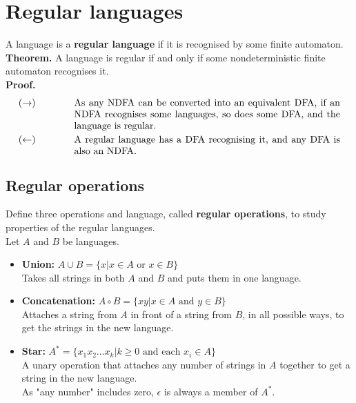 \documentclass{article}
\begin{document}
\section{Regular languages}
A language is a \textbf{regular language} if it is recognised by some finite automaton.\medskip
\\\textbf{Theorem.} A language is regular if and only if some nondeterministic finite automaton recognises it.\medskip
\\\textbf{Proof.}
\begin{align*}
(\rightarrow)\qquad&\qquad\parbox[t]{0.8\textwidth}{As any NDFA can be converted into an equivalent DFA, if an NDFA recognises some languages, so does some DFA, and the language is regular.} \\
(\leftarrow)\qquad&\qquad\parbox[t]{0.8\textwidth}{A regular language has a DFA recognising it, and any DFA is also an NDFA.}
\end{align*}

\subsection{Regular operations}
Define three operations and language, called \textbf{regular operations}, to study properties of the regular languages.\medskip
\\ Let $A$ and $B$ be languages.
\begin{itemize}
	\item \textbf{Union:} $A \cup B = \{x | x \in A\text{ or } x \in B\}$
	\\ Takes all strings in both $A$ and $B$ and puts them in one language.
	\item \textbf{Concatenation:} $A \circ B = \{xy | x \in A\text{ and } y \in B\}$
	\\ Attaches a string from $A$ in front of a string from $B$, in all possible ways, to get the strings in the new language.
	\item \textbf{Star:} $A^* = \{x_1x_2...x_k | k \geq 0\text{ and each } x_i \in A\}$
	\\ A unary operation that attaches any number of strings in $A$ together to get a string in the new language.
	\\ As "any number" includes zero, $\epsilon$ is always a member of $A^*$.
\end{itemize}
\end{document}
